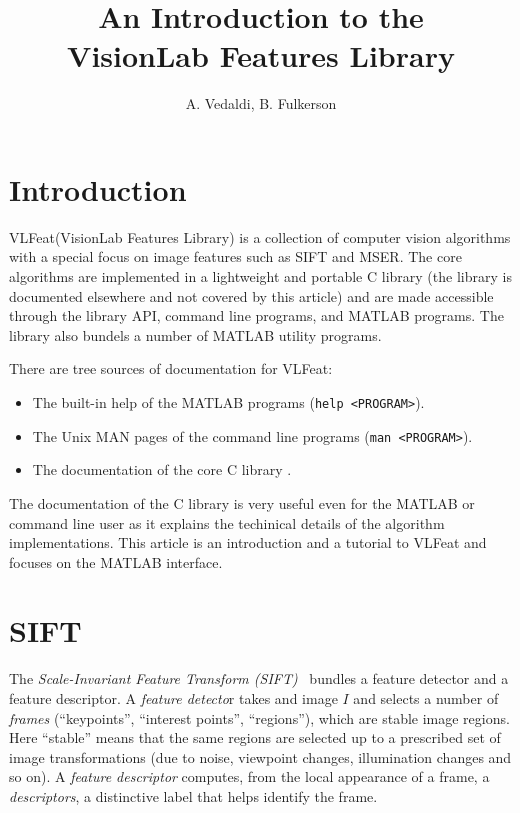 \documentclass[9pt]{article}
\title{An Introduction to the\\ VisionLab Features Library}
\author{A. Vedaldi, B. Fulkerson}
\newcommand{\VLFeat}{{\sc VLFeat}\xspace}
\begin{document}

\ifpdf\twocolumn\fi
\maketitle{}
\ifpdf\tableofcontents{}\fi

\section{Introduction}\label{intro}

\VLFeat (VisionLab Features Library) is a collection of computer
vision algorithms with a special focus on image features such as SIFT
and MSER. The core algorithms are implemented in a lightweight and
portable C library (the library is documented elsewhere and not
covered by this article) and are made accessible through the library
API, command line programs, and MATLAB programs. The library also
bundels a number of MATLAB utility programs.

There are tree sources of documentation for \VLFeat:
\begin{itemize}\raggedright
\item The built-in help of the MATLAB programs (\verb$help <PROGRAM>$).
\item The Unix MAN pages of the command line programs
  (\verb$man <PROGRAM>$).
\item The documentation of the core C library \cite{}.
\end{itemize}
The documentation of the C library is very useful even for the MATLAB
or command line user as it explains the techinical details of the
algorithm implementations.  This article is an introduction and a
tutorial to \VLFeat and focuses on the MATLAB interface.


\section{SIFT}\label{sift}

The {\em Scale-Invariant Feature Transform
  (SIFT)}~\cite{lowe04distinctive} bundles a feature detector and a
feature descriptor. A {\em feature detecto}r takes and image $I$ and
selects a number of {\em frames} (``keypoints'', ``interest points'',
``regions''), which are stable image regions. Here ``stable'' means
that the same regions are selected up to a prescribed set of image
transformations (due to noise, viewpoint changes, illumination changes
and so on). A {\em feature descriptor} computes, from the local
appearance of a frame, a {\em descriptors}, a distinctive label that
helps identify the frame.
\end{document}
